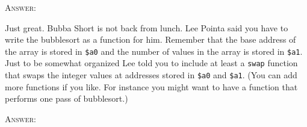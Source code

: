\textsc{Answer:}

\newpage
\nextq
Just great.
Bubba Short is not back from lunch.
Lee Pointa said you have to write the bubblesort as a function  for him.
Remember that
the base address of the array is stored in \verb!$a0!
and the number of values in the array is stored in \verb!$a1!.
Just to be somewhat organized Lee told you to include at least
a \verb!swap! function that swaps the integer values at
addresses stored in \verb!$a0! and \verb!$a1!.
(You can add more functions if you like.
For instance you might want to have a function that performs
one pass of bubblesort.)

\textsc{Answer:}

\newpage


